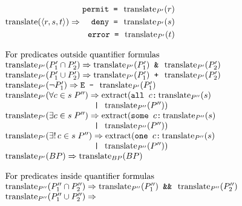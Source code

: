 \begin{figure}[t]
\[
\begin{array}{l}
 \translation(\langle r, s, t \rangle) \Rightarrow
  \begin{aligned}
    \mtt{permit = } \translation_{P'} (r) \\
    \mtt{deny = } \translation_{P'} (s) \\
    \mtt{error = } \translation_{P'} (t)
  \end{aligned} \nonumber \\
  \\
  \mbox{For predicates outside quantifier formulas} \\
  \translation_{P'} (P'_1 \cap P'_2) \Rightarrow  
  \translation_{P'} (P'_1) \mtt{ \& } \translation_{P'} (P'_2) \nonumber \\
  \translation_{P'} (P'_1 \cup P'_2) \Rightarrow  
  \translation_{P'} (P'_1) \mtt{ + } \translation_{P'} (P'_2) \nonumber \\
  \translation_{P'} (\neg P'_1) \Rightarrow  
  \mtt{E - } \translation_{P'} (P'_1) \\ %
  \translation_{P'} (\forall c \in s \; P'') \Rightarrow 
  \extract(\mtt{all } c \mtt{:} \translation_{P''} (s)  \\
   \qquad \qquad \qquad \qquad \qquad
              \mtt{ | } \translation_{P''} (P'')) \\ %
  \translation_{P'} (\exists c \in s \; P'') \Rightarrow 
  \extract(\mtt{some } c \mtt{:} \translation_{P''} (s) \\
  \qquad \qquad \qquad \qquad \qquad \mtt{ | }
  \translation_{P''} (P'')) \nonumber \\
  \translation_{P'} (\exists ! \, c \in s \; P'') \Rightarrow 
  \extract(\mtt{one } c \mtt{:} \translation_{P''} (s) \\
  \qquad \qquad \qquad \qquad \qquad \mtt{ | }
  \translation_{P''} (P'')) \nonumber \\
  \translation_{P'} (BP) \Rightarrow  \translation_{BP} (BP) \nonumber \\
  \\
  \mbox{For predicates inside quantifier formulas} \\
  \translation_{P''} (P''_1 \cap P''_2) \Rightarrow  
  \translation_{P''} (P''_1) \mtt{ \&\& } \translation_{P''} (P''_2) 
  \nonumber \\
  \translation_{P''} (P''_1 \cup P''_2) \Rightarrow  

\end{array}\]
\end{figure}
